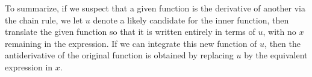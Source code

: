 \documentclass{ximera}
\begin{document}
To summarize, if we suspect that a given function is the derivative of
another via the chain rule, we let $u$ denote a likely candidate for
the inner function, then translate the given function so that it is
written entirely in terms of $u$, with no $x$ remaining in the
expression. If we can integrate this new function of $u$, then the
antiderivative of the original function is obtained by replacing $u$
by the equivalent expression in $x$.
\end{document}
